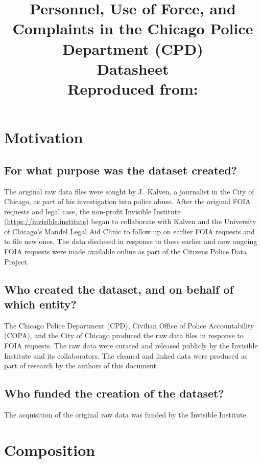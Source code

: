 \documentclass[letterpaper, 10 pt, conference]{ieeeconf}  %
\title{\LARGE \bf
Personnel, Use of Force, and Complaints in the Chicago Police Department (CPD)\\{\color{blue}Datasheet} \\ {\small Reproduced from: \cite{horel2021the}}
}
\begin{document}
\maketitle
\thispagestyle{empty}
\pagestyle{empty}

\section{Motivation}

\subsection{For what purpose was the dataset created?}
The original raw data files were sought by J.~Kalven, a journalist in the City
of Chicago, as part of his investigation into police abuse. After the original
FOIA requests and legal case, the non-profit Invisible Institute (\url{https://invisible.institute}) 
began to collaborate with Kalven and the University of Chicago's Mandel Legal Aid Clinic
to follow up on earlier FOIA requests and to file new ones. The data disclosed
in response to these earlier and now ongoing FOIA requests were made available
online as part of the Citizens Police Data Project.

\subsection{Who created the dataset, and on behalf of which entity?}
The Chicago Police Department (CPD), Civilian Office of Police Accountability
(COPA), and the City of Chicago produced the raw data files in response to FOIA
requests. The raw data were curated and released publicly by the Invisible
Institute and its collaborators. The cleaned and linked data were produced
as part of research by the authors of this document.

\subsection{Who funded the creation of the dataset?}
The acquisition of the original raw data was funded by the Invisible Institute.

\section{Composition}
\end{document}
